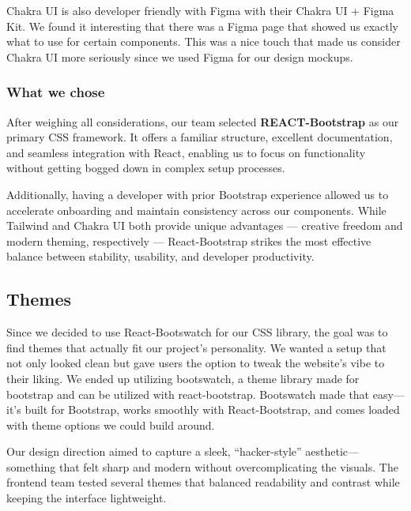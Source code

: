 \documentclass[12pt]{article}
\begin{document}
Chakra UI is also developer friendly with Figma with their Chakra UI + Figma Kit.
We found it interesting that there was a Figma page that showed us exactly what to use for certain components.
This was a nice touch that made us consider Chakra UI more seriously since we used Figma for our design mockups.

\subsubsection{What we chose}
After weighing all considerations, our team selected \textbf{REACT-Bootstrap} as our primary CSS framework.
It offers a familiar structure, excellent documentation, and seamless integration with React,
enabling us to focus on functionality without getting bogged down in complex setup processes.

Additionally, having a developer with prior Bootstrap experience allowed us to accelerate onboarding
and maintain consistency across our components.
While Tailwind and Chakra UI both provide unique advantages — creative freedom and modern theming,
respectively — React-Bootstrap strikes the most effective balance between stability, usability, and developer productivity.

\subsection{Themes}
Since we decided to use React-Bootswatch for our CSS library, the goal was to find themes that actually fit our project’s personality.
We wanted a setup that not only looked clean but gave users the option to tweak the website’s vibe to their liking.
We ended up utilizing bootswatch, a theme library made for bootstrap and can be utilized with react-bootstrap.
Bootswatch made that easy—it’s built for Bootstrap, works smoothly with React-Bootstrap, and comes loaded with theme options we could build around.

Our design direction aimed to capture a sleek, “hacker-style” aesthetic—something that felt sharp and modern without overcomplicating the visuals.
The frontend team tested several themes that balanced readability and contrast while keeping the interface lightweight.
\end{document}
